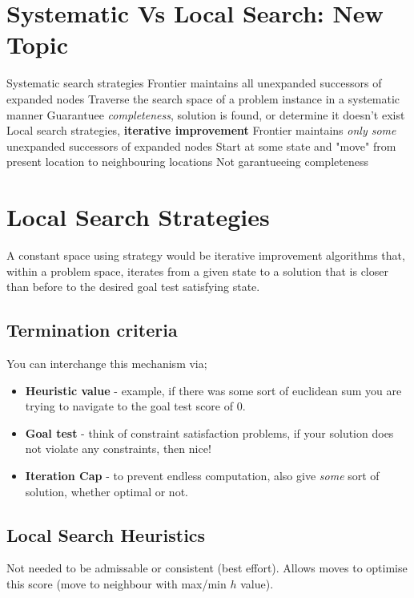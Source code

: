 \documentclass{article}
\begin{document}
\section{Systematic Vs Local Search: New Topic}

\begin{outline}
	\1 Systematic search strategies
		\2 Frontier maintains all unexpanded successors of expanded nodes
		\2 Traverse the search space of a problem instance in a systematic manner
		\2 Guarantuee \emph{completeness}, solution is found, or determine it doesn't exist
	\1 Local search strategies, \textbf{iterative improvement}
		\2 Frontier maintains \emph{only some} unexpanded successors of expanded nodes
		\2 Start at some state and "move" from present location to neighbouring locations
		\2 Not garantueeing completeness
\end{outline}

\section*{Local Search Strategies}
A constant space using strategy would be iterative improvement algorithms that, within a problem space, iterates from a given state to a solution that is closer than before to the desired goal test satisfying state.

\subsection*{Termination criteria}
You can interchange this mechanism via;

\begin{itemize}
	\item \textbf{Heuristic value} - example, if there was some sort of euclidean sum you are trying to navigate to the goal test score of 0.
	\item \textbf{Goal test} - think of constraint satisfaction problems, if your solution does not violate any constraints, then nice!
	\item \textbf{Iteration Cap} - to prevent endless computation, also give \emph{some} sort of solution, whether optimal or not.
\end{itemize}

\subsection*{Local Search Heuristics}
Not needed to be admissable or consistent (best effort). Allows moves to optimise this score (move to neighbour with max/min $h$ value).
\end{document}
